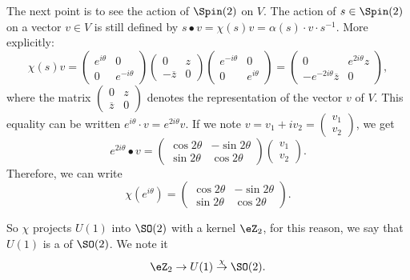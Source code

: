 The next point is to see the action of $\Spin(2)$ on $V$. The action of $s\in\Spin(2)$ on a vector $v\in V$ is still defined by $s\bullet v=\chi(s)v=\alpha(s)\cdot v\cdot s^{-1}$. More explicitly:
\begin{equation}
 \chi(s)v=\begin{pmatrix}
 e^{i\theta} & 0 \\
 0 & e^{-i\theta}
 \end{pmatrix} \begin{pmatrix}
 0 & z \\
 -\overline{z} & 0
 \end{pmatrix} \begin{pmatrix}
 e^{-i\theta} & 0 \\
 0 & e^{i\theta}
 \end{pmatrix}=\begin{pmatrix}
 0 & e^{2i\theta}z  \\
 -e^{-2i\theta}\overline{z} & 0
 \end{pmatrix},
\end{equation}
where the  matrix $\begin{pmatrix}
0 & z \\
\overline{z} & 0
\end{pmatrix} $ denotes the representation of the vector $v$ of $V$. This equality can be written $e^{i\theta}\cdot v=e^{2i\theta}v$. If we note $v=v_1+iv_2=\begin{pmatrix}
v_1 \\
v_2
\end{pmatrix} $, we get
\[ e^{2i\theta}\bullet v=\begin{pmatrix}
\cos 2\theta & -\sin 2\theta \\
\sin 2\theta & \cos 2\theta
\end{pmatrix}\begin{pmatrix}
v_1 \\
v_2
\end{pmatrix}. \]
Therefore, we can write
\[\chi(e^{i\theta})=\begin{pmatrix}
\cos 2\theta & -\sin 2\theta \\
\sin 2\theta & \cos 2\theta
\end{pmatrix}.\]

So $\chi$ projects $U(1)$ into $\SO(2)$ with a kernel $\eZ_2$, for this reason, we say that $U(1)$ is a  of $\SO(2)$. We note it
\begin{equation}
            \eZ_2\rightarrow U(1)\stackrel{\chi}{\rightarrow}\SO(2).
\end{equation}

